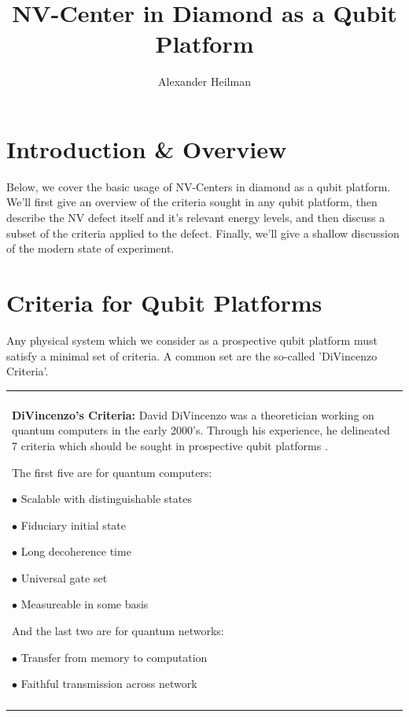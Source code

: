 \documentclass[10pt,a4paper]{article}
\title{NV-Center in Diamond as a Qubit Platform}
\author{Alexander Heilman}
\newenvironment{boxed2}
    {\begin{center}
    \begin{tabular}{|p{0.455\textwidth}|}
    \hline\\
    }
    { 
    \\\\\hline
    \end{tabular} 
    \end{center}
    }
\begin{document}
\vspace{-3cm}
 
\maketitle

\begin{multicols}{2}

\section*{Introduction \& Overview}
Below, we cover the basic usage of NV-Centers in diamond as a qubit platform. We'll first give an overview of the criteria sought in any qubit platform, then describe the NV defect itself and it's relevant energy levels, and then discuss a subset of the criteria applied to the defect. Finally, we'll give a shallow discussion of the modern state of experiment.


\section{Criteria for Qubit Platforms}
Any physical system which we consider as a prospective qubit platform must satisfy a minimal set of criteria. A common set are the so-called 'DiVincenzo Criteria'.


\begin{boxed2}
\vspace{-.4cm}

\textbf{DiVincenzo's Criteria:} David DiVincenzo was a theoretician working on quantum computers in the early 2000's. Through his experience, he delineated 7 criteria which should be sought in prospective qubit platforms \cite{DiVincenzo_2000}.

\medskip

The first five are for quantum computers:


$\bullet$ Scalable with distinguishable states


$\bullet$ Fiduciary initial state

$\bullet$ Long decoherence time


$\bullet$ Universal gate set

$\bullet$ Measureable in some basis

\medskip

And the last two are for quantum networks:


$\bullet$ Transfer from memory to computation

$\bullet$ Faithful transmission across network


\end{boxed2}
\end{multicols}
\end{document}

